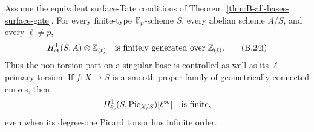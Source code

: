 \begin{proposition}
\label{prop:B-integral-torsor-lattice}
Assume the equivalent surface-Tate conditions of
Theorem~\ref{thm:B-all-bases-surface-gate}.  For every
finite-type \(\mathbb F_p\)-scheme \(S\), every abelian scheme
\(A/S\), and every \(\ell\ne p\),
\[
 H^1_{\mathrm{\acute et}}(S,A)\otimes\mathbb Z_{(\ell)}
       \quad\hbox{is finitely generated over }\mathbb Z_{(\ell)}.
                                                               \tag{B.24i}
\]
Thus the non-torsion part on a singular base is controlled as
well as its \(\ell\)-primary torsion.  If \(f:X\to S\)
is a smooth proper family of geometrically connected curves,
then
\[
 H^1_{\mathrm{\acute et}}(S,\operatorname{Pic}_{X/S})[\ell^\infty]
       \quad\hbox{is finite},
\]
even when its degree-one Picard torsor has infinite order.
\end{proposition}

